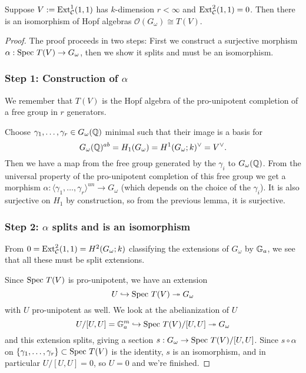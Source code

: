 \begin{prop}
 Suppose $V := \mathrm{Ext}^1_{\mathcal{C}}(1,1)$ has $k$-dimension $r < \infty$ and $\mathrm{Ext}^2_{\mathcal{C}}(1,1) = 0$. Then there is an isomorphism of Hopf algebras $\mathcal{O}(G_\omega) \cong T(V)$.
\end{prop}
\begin{proof}
The proof proceeds in two steps:
First we construct a surjective morphism $\alpha : \mathrm{Spec}~ T(V) \to G_\omega$, then we show it splits and must be an isomorphism.

\subsubsection{Step 1: Construction of $\alpha$}
We remember that $T(V)$ is the Hopf algebra of the pro-unipotent completion of a free group in $r$ generators.

Choose $\gamma_1,\ldots,\gamma_r \in G_\omega(\mathbb{Q})$ minimal such that their image is a basis for
\[G_\omega(\mathbb{Q})^{ab} = H_1(G_\omega) = H^1(G_\omega;k)^\vee = V^\vee.\]
Then we have a map from the free group generated by the $\gamma_i$ to $G_\omega(\mathbb{Q})$.
From the universal property of the pro-unipotent completion of this free group we get a morphism $\alpha : \langle \gamma_1,\ldots,\gamma_r\rangle^{un} \to G_\omega$ (which depends on the choice of the $\gamma_i$).
It is also surjective on $H_1$ by construction, so from the previous lemma, it is surjective.


\subsubsection{Step 2: $\alpha$ splits and is an isomorphism}
From $0 = \mathrm{Ext}^2_{\mathcal{C}}(1,1) = H^2(G_\omega;k)$ classifying the extensions of $G_\omega$ by $\mathbb{G}_a$, we see that all these must be split extensions.

Since $\mathrm{Spec}~ T(V)$ is pro-unipotent, we have an extension
\[U \hookrightarrow \mathrm{Spec}~ T(V) \twoheadrightarrow G_\omega\]
with $U$ pro-unipotent as well. We look at the abelianization of $U$
\[U/[U,U]=\mathbb{G}_a^m \hookrightarrow \mathrm{Spec}~ T(V)/[U,U] \twoheadrightarrow G_\omega\]
and this extension splits, giving a section $s : G_\omega \to \mathrm{Spec}~ T(V)/[U,U]$.
Since $s \circ \alpha$ on $\{\gamma_1,\ldots,\gamma_r\} \subset \mathrm{Spec}~ T(V)$ is the identity,
$s$ is an isomorphism, and in particular $U/[U,U] = 0$, so $U=0$ and we're finished.
\end{proof}








